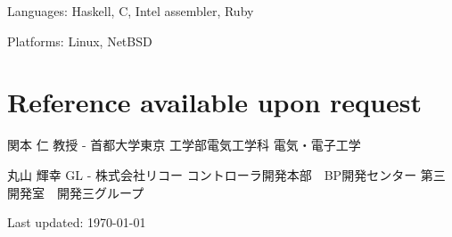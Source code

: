 \documentclass[letterpaper]{article}
\def\footer{
  \begin{center}
    \begin{footnotesize}
      Last updated: \today
    \end{footnotesize}
  \end{center}
}
\renewenvironment{itemize}{
  \begin{list}{}{
    \setlength{\leftmargin}{1.5em}
  }
}{
  \end{list}
}
\begin{document}
\begin{itemize}
  \item Languages: Haskell, C, Intel assembler, Ruby
  \item Platforms: Linux, NetBSD
\end{itemize}

\section*{Reference available upon request}

\begin{itemize}
  \item 関本 仁 教授 - 首都大学東京 工学部電気工学科 電気・電子工学
  \item 丸山 輝幸 GL - 株式会社リコー コントローラ開発本部　BP開発センター 第三開発室　開発三グループ
\end{itemize}

\bigskip
\footer
\end{document}
